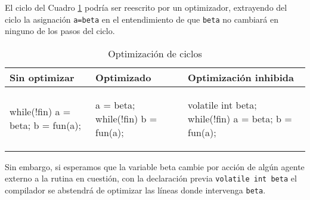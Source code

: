 \begin{ejemplo}

El ciclo del Cuadro \ref{tab:ciclo} podría ser reescrito por un optimizador, extrayendo del ciclo la
asignación \texttt{a=beta} en el entendimiento de que \texttt{beta} no cambiará en ninguno de los pasos del ciclo.
\begin{table}
\centering	
\begin{tabular}{l|l|l}
Sin optimizar & Optimizado & Optimización inhibida\\
\hline
\begin{codecell}
while(!fin) {
	a = beta;
	b = fun(a);
}
\end{codecell}
&
\begin{codecell}
a = beta;
while(!fin)
	b = fun(a);
\end{codecell}
&
\begin{codecell}
volatile int beta;
while(!fin) {
	a = beta;
	b = fun(a);
}
\end{codecell}
\\
\end{tabular} 
  \caption{Optimización de ciclos}
  \label{tab:ciclo} 
\end{table}

Sin embargo, si esperamos que la variable beta cambie por acción de algún agente externo a la rutina
en cuestión, con la declaración previa
\texttt{volatile int beta}
el compilador se abstendrá de optimizar las líneas donde intervenga \texttt{beta}.
\end{ejemplo}


